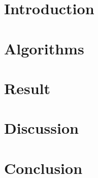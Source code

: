 \documentclass[a4paper,12pt]{article}
\begin{document}
    \newpage

    \tableofcontents

    \newpage

    \section{Introduction}
        

    \section{Algorithms}
        

    \section{Result}
       

    \section{Discussion}
        

    \section{Conclusion}
        

    \newpage

    \printbibliography
\end{document}
